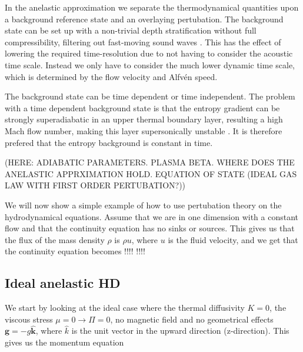 In the anelastic approximation we separate the thermodynamical quantities upon a background reference state and an overlaying pertubation. The background state can be set up with a non-trivial depth stratification without full compressibility, filtering out fast-moving sound waves \citep{1999ApJS..121..247L}. This has the effect of lowering the required time-resolution due to not having to consider the acoustic time scale. Instead we only have to consider the much lower dynamic time scale, which is determined by the flow velocity and Alfvén speed. 

The background state can be time dependent \citep{1976ApJ...207..545T} or time independent. The problem with a time dependent background state is that the entropy gradient can be strongly superadiabatic in an upper thermal boundary layer, resulting a high Mach flow number, making this layer supersonically unstable \citep{1975JFM....68..695G}. It is therefore prefered that the entropy background is constant in time.

(HERE: ADIABATIC PARAMETERS. PLASMA BETA. WHERE DOES THE ANELASTIC APPRXIMATION HOLD. EQUATION OF STATE (IDEAL GAS LAW WITH FIRST ORDER PERTUBATION?))

We will now show a simple example of how to use pertubation theory on the hydrodynamical equations. Assume that we are in one dimension with a constant flow and that the continuity equation has no sinks or sources. This gives us that the flux of the mass density $\rho$ is $\rho u$, where $u$ is the fluid velocity, and we get that the continuity equation becomes
!!!!
!!!!



\subsection{Ideal anelastic HD}
We start by looking at the ideal case where the thermal diffusivity $K=0$, the viscous stress $\mu=0\rightarrow\Pi=0$, no magnetic field and no geometrical effects $\mathbf{g}=-g\mathbf{\hat{k}}$, where ${\hat{k}}$ is the unit vector in the upward direction (z-direction). This gives us the momentum equation

